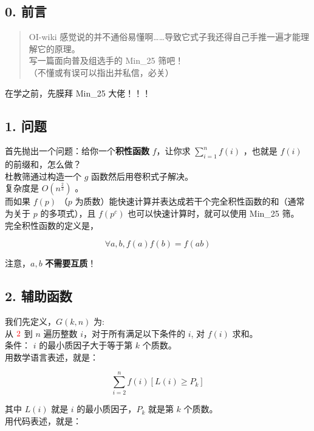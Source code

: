 \documentclass[
]{article}
\author{}
\date{}
\begin{document}
\subsection{0. 前言}\label{0-ux524dux8a00}

\begin{quote}
OI-wiki
感觉说的并不通俗易懂啊\ldots\ldots 导致它式子我还得自己手推一遍才能理解它的原理。
\\
写一篇面向普及组选手的 Min\_25 筛吧！\\
（不懂或有误可以指出并私信，必关）
\end{quote}

在学之前，先膜拜 Min\_25 大佬！！！

\subsection{1. 问题}\label{1-ux95eeux9898}

首先抛出一个问题：给你一个\textbf{积性函数} \(f\)，让你求
\(\displaystyle\sum_{i=1}^nf(i)\) ，也就是 \(f(i)\) 的前缀和，怎么做？\\
杜教筛通过构造一个 \(g\) 函数然后用卷积式子解决。\\
复杂度是 \(O(n^{\frac{2}{3}})\) 。\\
而如果 \(f(p)\) （\(p\)
为质数）能快速计算并表达成若干个完全积性函数的和（通常为关于 \(p\)
的多项式），且 \(f(p^c)\) 也可以快速计算时，就可以使用 Min\_25 筛。\\
完全积性函数的定义是，

\[\forall a,b,f(a)f(b)=f(ab)\]

注意，\(a,b\) \textbf{不需要互质}！

\subsection{2. 辅助函数}\label{2-ux8f85ux52a9ux51fdux6570}

我们先定义，\(G(k,n)\) 为:\\
从 \(\color{red}2\) 到 \(n\) 遍历整数 \(i\)，对于所有满足以下条件的
\(i\), 对 \(f(i)\) 求和。\\
条件： \(i\) 的最小质因子大于等于第 \(k\) 个质数。\\
用数学语言表述，就是：

\[\sum_{i=2}^nf(i)[L(i)\ge P_k]\]

其中 \(L(i)\) 就是 \(i\) 的最小质因子，\(P_k\) 就是第 \(k\) 个质数。\\
用代码表述，就是：
\end{document}

